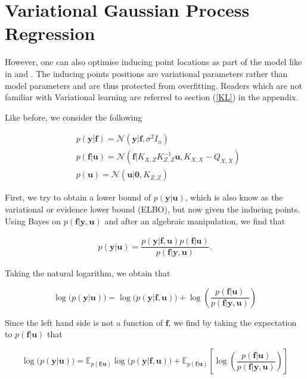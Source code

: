 \documentclass[12pt,a4paper,oneside]{book}
\begin{document}
\section{Variational Gaussian Process Regression}\label{var_regr}

However, one can also optimise inducing point locations as part of the model like in \cite{titsias2009variational} and \cite{hensman2013gaussian}. The inducing points positions are variational parameters rather than model parameters and are thus protected from overfitting. Readers which are not familiar with Variational learning are referred to section (\ref{KL}) in the appendix.

Like before, we consider the following 

\begin{equation}\label{variational_start}
\begin{aligned}
&p(\bm{y}|\bm{f}) = \mathcal{N}(\bm{y} | \bm{f}, \sigma^2 I_n) \\
&p(\bm{f}|\bm{u}) = \mathcal{N} (\bm{f}|K_{X,Z} K^{-1}_{Z,Z} \bm{u} , K_{X,X} - Q_{X,X}) \\
&p(\bm{u}) = \mathcal{N}( \bm{u} | \bm{0}, K_{Z,Z})
\end{aligned}
\end{equation}

First, we try to obtain a lower bound of $p(\bm{y}|\bm{u})$, which is also know as the variational or evidence lower bound (ELBO), but now given the inducing points. Using Bayes on ${p(\bm{f}|\bm{y},\bm{u})}$ and after an algebraic manipulation, we find that

\begin{align}
p(\bm{y}|\bm{u}) = \dfrac{p(\bm{y}|\bm{f}, \bm{u})p(\bm{f}|\bm{u})}{p(\bm{f}|\bm{y},\bm{u})}.
\end{align}

Taking the natural logarithm, we obtain that

\begin{equation}
\log{(p(\bm{y}|\bm{u})}) = \log{(p(\bm{y}|\bm{f}, \bm{u})}) + \log{\left(\dfrac{p(\bm{f}|\bm{u})}{p(\bm{f}|\bm{y},\bm{u})}\right)}
\end{equation}

Since the left hand side is not a function of $\bm{f}$, we find by taking the expectation to $p(\bm{f}|\bm{u})$ that 

\begin{equation}\label{sparse_var_1}
\log{(p(\bm{y}|\bm{u})}) = \mathbb{E}_{p(\bm{f}|\bm{u})}\log{(p(\bm{y}|\bm{f}, \bm{u})}) + \mathbb{E}_{p(\bm{f}|\bm{u})} \left[ \log{\left(\dfrac{p(\bm{f}|\bm{u})}{p(\bm{f}|\bm{y},\bm{u})}\right)} \right]
\end{equation}
\end{document}

